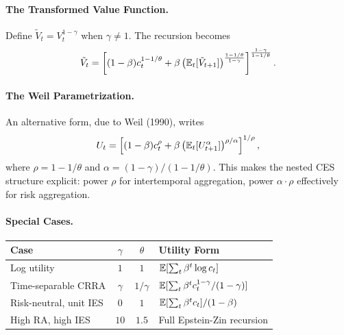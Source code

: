 \paragraph{The Transformed Value Function.}

Define $\tilde{V}_t = V_t^{1-\gamma}$ when $\gamma \neq 1$. The recursion becomes
\begin{equation}
\tilde{V}_t = \left[ (1-\beta) c_t^{1-1/\theta} + \beta \left( \mathbb{E}_t[\tilde{V}_{t+1}] \right)^{\frac{1-1/\theta}{1-\gamma}} \right]^{\frac{1-\gamma}{1-1/\theta}}.
\label{eq:ez-transformed}
\end{equation}

\paragraph{The Weil Parametrization.}

An alternative form, due to Weil (1990), writes
\begin{equation}
U_t = \left[ (1-\beta) c_t^{\rho} + \beta \left( \mathbb{E}_t[U_{t+1}^{\alpha}] \right)^{\rho/\alpha} \right]^{1/\rho},
\label{eq:weil-form}
\end{equation}
where $\rho = 1 - 1/\theta$ and $\alpha = (1-\gamma)/(1-1/\theta)$. This makes the nested CES structure explicit: power $\rho$ for intertemporal aggregation, power $\alpha \cdot \rho$ effectively for risk aggregation.

\paragraph{Special Cases.}

\begin{center}
\renewcommand{\arraystretch}{1.4}
\begin{tabular}{@{}lccl@{}}
\toprule
\textbf{Case} & $\gamma$ & $\theta$ & \textbf{Utility Form} \\
\midrule
Log utility & $1$ & $1$ & $\mathbb{E}[\sum_t \beta^t \log c_t]$ \\
Time-separable CRRA & $\gamma$ & $1/\gamma$ & $\mathbb{E}[\sum_t \beta^t c_t^{1-\gamma}/(1-\gamma)]$ \\
Risk-neutral, unit IES & $0$ & $1$ & $\mathbb{E}[\sum_t \beta^t c_t] / (1-\beta)$ \\
High RA, high IES & $10$ & $1.5$ & Full Epstein-Zin recursion \\
\bottomrule
\end{tabular}
\end{center}

